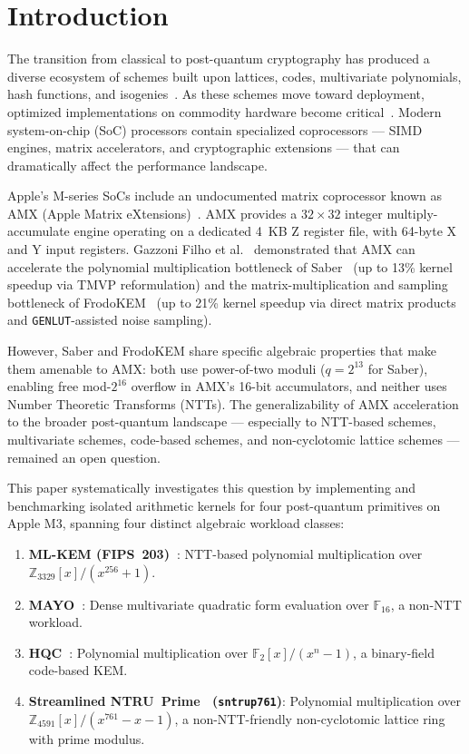 \documentclass[utf8]{FrontiersinHarvard}
\begin{document}
\section{Introduction}

The transition from classical to post-quantum cryptography has produced a diverse ecosystem of schemes built upon lattices, codes, multivariate polynomials, hash functions, and isogenies~\cite{nist2022pqc}. As these schemes move toward deployment, optimized implementations on commodity hardware become critical~\cite{nejatollahi2019pqcsurvey}. Modern system-on-chip (SoC) processors contain specialized coprocessors --- SIMD engines, matrix accelerators, and cryptographic extensions --- that can dramatically affect the performance landscape.

Apple's M-series SoCs include an undocumented matrix coprocessor known as AMX (Apple Matrix eXtensions)~\cite{dougallj2022amx}. AMX provides a $32\times32$ integer multiply-accumulate engine operating on a dedicated 4~KB Z register file, with 64-byte X and Y input registers. Gazzoni Filho et al.~\cite{gazzoni2024pqcamx} demonstrated that AMX can accelerate the polynomial multiplication bottleneck of Saber~\cite{dangelo2018saber} (up to 13\% kernel speedup via TMVP reformulation) and the matrix-multiplication and sampling bottleneck of FrodoKEM~\cite{bos2020frodokem} (up to 21\% kernel speedup via direct matrix products and \texttt{GENLUT}-assisted noise sampling).

However, Saber and FrodoKEM share specific algebraic properties that make them amenable to AMX: both use power-of-two moduli ($q = 2^{13}$ for Saber), enabling free mod-$2^{16}$ overflow in AMX's 16-bit accumulators, and neither uses Number Theoretic Transforms (NTTs). The generalizability of AMX acceleration to the broader post-quantum landscape --- especially to NTT-based schemes, multivariate schemes, code-based schemes, and non-cyclotomic lattice schemes --- remained an open question.

This paper systematically investigates this question by implementing and benchmarking isolated arithmetic kernels for four post-quantum primitives on Apple M3, spanning four distinct algebraic workload classes:

\begin{enumerate}
  \item \textbf{ML-KEM (FIPS~203)~\cite{fips203}}: NTT-based polynomial multiplication over $\mathbb{Z}_{3329}[x]/(x^{256}+1)$.
  \item \textbf{MAYO~\cite{mayo2025spec}}: Dense multivariate quadratic form evaluation over $\mathbb{F}_{16}$, a non-NTT workload.
  \item \textbf{HQC~\cite{hqc2025spec}}: Polynomial multiplication over $\mathbb{F}_2[x]/(x^n - 1)$, a binary-field code-based KEM.
  \item \textbf{Streamlined NTRU~Prime~\cite{ntruprime2017spec} (\texttt{sntrup761})}: Polynomial multiplication over $\mathbb{Z}_{4591}[x]/(x^{761}-x-1)$, a non-NTT-friendly non-cyclotomic lattice ring with prime modulus.
\end{enumerate}
\end{document}
